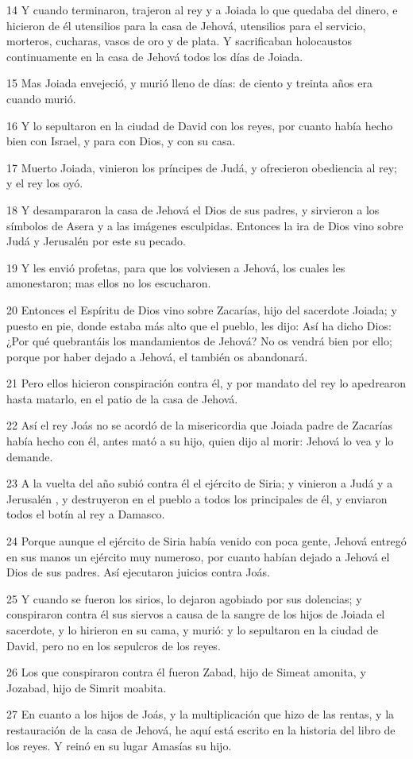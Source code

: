 \par 14 Y cuando terminaron, trajeron al rey y a Joiada lo que quedaba del dinero, e hicieron de él utensilios para la casa de Jehová, utensilios para el servicio, morteros, cucharas, vasos de oro y de plata. Y sacrificaban holocaustos continuamente en la casa de Jehová todos los días de Joiada.
\par 15 Mas Joiada envejeció, y murió lleno de días: de ciento y treinta años era cuando murió.
\par 16 Y lo sepultaron en la ciudad de David con los reyes, por cuanto había hecho bien con Israel, y para con Dios, y con su casa.
\par 17 Muerto Joiada, vinieron los príncipes de Judá, y ofrecieron obediencia al rey;  y el rey los oyó.
\par 18 Y desampararon la casa de Jehová el Dios de sus padres, y sirvieron a los símbolos de Asera y a las imágenes esculpidas. Entonces la ira de Dios vino sobre Judá y Jerusalén  por este su pecado.
\par 19 Y les envió profetas, para que los volviesen a Jehová, los cuales les amonestaron; mas ellos no los escucharon.
\par 20 Entonces el Espíritu de Dios vino sobre Zacarías, hijo del sacerdote Joiada; y puesto en pie, donde estaba más alto que el pueblo, les dijo: Así ha dicho Dios: ¿Por qué quebrantáis los mandamientos de Jehová?  No os vendrá bien por ello; porque por haber dejado a Jehová, el también os abandonará.
\par 21 Pero ellos hicieron conspiración contra él, y por mandato del rey lo apedrearon hasta matarlo, en el patio de la casa de Jehová. 
\par 22 Así el rey Joás no se acordó de la misericordia que Joiada padre de Zacarías había hecho con él, antes mató a su hijo, quien dijo al morir: Jehová lo vea y lo demande.
\par 23 A la vuelta del año subió contra él el ejército de Siria; y vinieron a Judá y a Jerusalén , y destruyeron en el pueblo a todos los principales de él, y enviaron todos el botín al rey a Damasco.
\par 24 Porque aunque el ejército de Siria había venido con poca gente, Jehová entregó en sus manos un ejército muy numeroso, por cuanto habían dejado a Jehová el Dios de sus padres. Así ejecutaron juicios contra Joás.
\par 25 Y cuando se fueron los sirios, lo dejaron agobiado por sus dolencias; y conspiraron contra él sus siervos a causa de la sangre de los hijos de Joiada el sacerdote, y lo hirieron en su cama, y murió: y lo sepultaron en la ciudad de David, pero no en los sepulcros de los reyes.
\par 26 Los que conspiraron contra él fueron Zabad, hijo de Simeat amonita, y Jozabad, hijo de Simrit moabita.
\par 27 En cuanto a los hijos de Joás, y la multiplicación que hizo de las rentas, y la restauración de la casa de Jehová, he aquí está escrito en la historia del libro de los reyes. Y reinó en su lugar Amasías su hijo.

